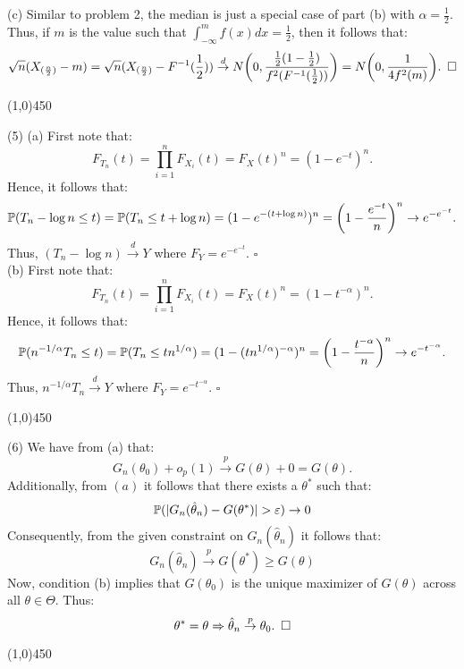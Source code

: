 \documentclass[12pt]{article}
\begin{document}
\noindent
(c) Similar to problem 2, the median is just a special case of part (b) with $\alpha = \frac{1}{2}$. Thus, if $m$ is the value such that $\int_{-\infty}^m f(x) dx = \frac{1}{2}$, then it follows that:
$$\sqrt{n}(X_{(\frac{n}{2})}-m)
= \sqrt{n}(X_{(\frac{n}{2})}-F^{-1}(\frac{1}{2}))
\overset{d}\to N \biggl(0,\frac{\frac{1}{2}(1-\frac{1}{2})}{f^2(F^{-1}(\frac{1}{2}))} \biggr)
= N \biggl(0,\frac{1}{4f^2(m)} \biggr). \hspace{5 pt} \square$$

\begin{center}
\line(1,0){450}
\end{center}


\noindent
(5) (a) First note that:
$$F_{T_n} (t)
= \prod_{i=1}^n F_{X_i} (t)
= F_X(t)^n 
= (1-e^{-t})^n.$$
Hence, it follows that:
$$\mathbb{P}(T_n - \log n \leq t) 
= \mathbb{P}(T_n \leq t+\log n)
= (1-e^{-(t+\log n)})^n
= \biggl(1-\frac{e^{-t}}{n} \biggr)^n
\to e^{-e^{-t}}.$$
Thus, $(T_n-\log n) \overset{d}\to Y$ where $F_Y = e^{-e^{-t}}.$ $\square$\\

\noindent
(b) First note that:
$$F_{T_n}(t)
= \prod_{i=1}^n F_{X_i}(t)
= F_X(t)^n
= (1-t^{-\alpha})^n.$$
Hence, it follows that:
$$\mathbb{P}(n^{-1/\alpha}T_n \leq t) 
= \mathbb{P}(T_n \leq t n^{1/\alpha})
= (1-(tn^{1/\alpha})^{-\alpha})^n
= \biggl(1-\frac{t^{-\alpha}}{n} \biggr)^n
\to e^{-t^{-\alpha}}.$$
Thus, $n^{-1/\alpha}T_n \overset{d}\to Y$ where $F_Y = e^{-t^{-\alpha}}.$ $\square$

\begin{center}
\line(1,0){450}
\end{center}


\noindent
(6) We have from (a) that:
$$G_n(\theta_0)+o_p(1) \overset{p}\to G(\theta) + 0 = G(\theta).$$
Additionally, from $(a)$ it follows that there exists a $\theta^*$ such that:
$$\prob(|G_n(\hat{\theta}_n)-G(\theta^*)|>\varepsilon) \to 0$$
Consequently, from the given constraint on $G_n(\hat{\theta}_n)$ it follows that:
$$G_n(\hat{\theta}_n) \overset{p}\to G(\theta^*) \geq G(\theta)$$
Now, condition (b) implies that $G(\theta_0)$ is the unique maximizer of $G(\theta)$ across all $\theta \in \Theta$. Thus:
$$\theta^* = \theta \Rightarrow \hat{\theta}_n \overset{p}\to \theta_0. \hspace{5 pt} \square$$

\begin{center}
\line(1,0){450}
\end{center}
\end{document}
